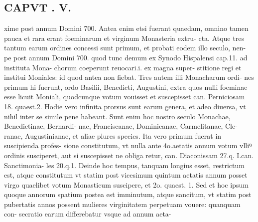 \documentclass{article}
\begin{document}
\begin{pages}
\section*{CAPVT . V. }
\marginpar{[ p.293 ]}\pstart xime post annum Domini 700. Antea enim etsi fuerant quaedam, omnino tamen pauca et rara erant foeminarum et virginum Monasteria extru- cta. Atque tres tantum earum ordines concessi sunt primum, et probati eodem illo seculo, nen- pe post annum Domini 700. quod tunc demum ex Synodo Hispalensi cap.11. ad instituta Mona- chorum coeperunt reuocari.i. ex magna super- stitione regi et institui Moniales: id quod antea non fiebat. Tres autem illi Monacharum ordi- nes primum hi fuerunt, ordo Basilii, Benedicti, Augustini, extra quos nulli foeminae esse licuit Moniali, quodcunque votum vouisset et suscepisset can. Perniciosam 18. quaest.2. Hodie vero infinita prorsus sunt earum genera, et adeo diuersa, vt nihil inter se simile pene habeant. Sunt enim hoc nostro seculo Monachae, Benedictinae, Bernardi- nae, Franciscanae, Dominicanae, Carmelitanae, Cle- ranae, Augustinianae, et aliae plures species. Ita vero primum fuerat in suscipienda profes- sione constitutum, vt nulla ante 4o.aetatis annum votum vlliꝰ ordinis susciperet, aut si suscepisset ne obliga retur, can. Diaconissam 27.q. I.can. Sanctimonia- les 20.q.1. Deinde hoc tempus, tanquam longius esset, restrictum est, atque constitutum vt statim post vicesimum quintum aetatis annum posset virgo quaelibet votum Monasticum suscipere, et 2o. quaest. 1. Sed et hoc ipsum quoque annorum spatium postea est imminutum, atque sancitum, vt statim post pubertatis annos possent mulieres virginitatem perpetuam vouere: quanquam con- secratio earum differebatur vsque ad annum aeta-  \pend

\end{pages}
\end{document}
